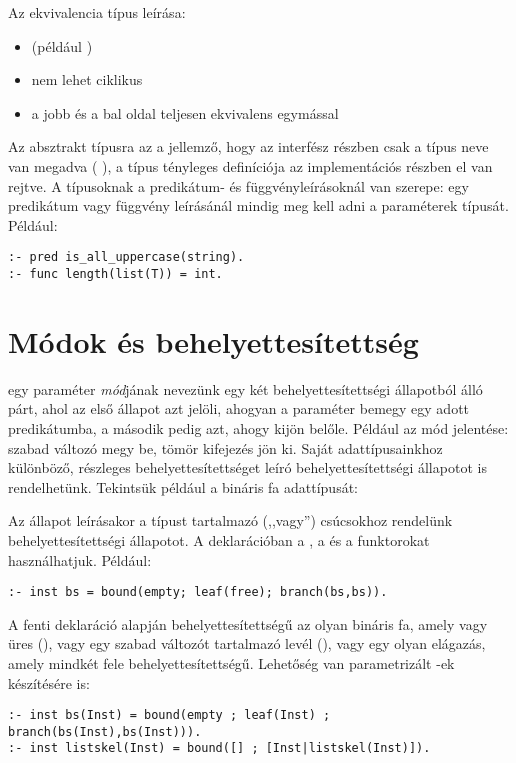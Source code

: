 Az ekvivalencia típus leírása:

\begin{itemize}
\item {}  \cd{==}  (például
)
\item nem lehet ciklikus
\item a jobb és a bal oldal teljesen ekvivalens egymással
\end{itemize}

Az absztrakt típusra az a jellemző, hogy az interfész részben csak a típus neve
van megadva ( ), a típus tényleges definíciója az
implementációs részben el van rejtve.
\br
A típusoknak a predikátum- és függvényleírásoknál van szerepe: egy predikátum
vagy függvény leírásánál mindig meg kell adni a paraméterek típusát. Például:

\begin{verbatim}
:- pred is_all_uppercase(string).
:- func length(list(T)) = int.
\end{verbatim}

\section{Módok és behelyettesítettség}

 egy paraméter \emph{mód}jának nevezünk egy két behelyettesítettségi állapotból
álló párt, ahol az első állapot azt jelöli, ahogyan a paraméter bemegy egy adott
predikátumba, a második pedig azt, ahogy kijön belőle. Például az  mód jelentése:
szabad változó megy be, tömör kifejezés jön ki.
\br
Saját adattípusainkhoz különböző, részleges behelyettesítettséget leíró behelyettesítettségi
állapotot is rendelhetünk. Tekintsük például a bináris fa adattípusát:


Az állapot leírásakor a típust tartalmazó (,,vagy'') csúcsokhoz rendelünk
behelyettesítettségi állapotot. A deklarációban a , a  és a
 funktorokat használhatjuk. Például:
\begin{verbatim}
:- inst bs = bound(empty; leaf(free); branch(bs,bs)).
\end{verbatim}
A fenti deklaráció alapján  behelyettesítettségű az olyan bináris fa, amely
vagy üres (), vagy egy szabad változót tartalmazó levél (),
vagy egy olyan elágazás, amely mindkét fele  behelyettesítettségű. Lehetőség
van parametrizált -ek készítésére is:
\begin{verbatim}
:- inst bs(Inst) = bound(empty ; leaf(Inst) ; branch(bs(Inst),bs(Inst))).
:- inst listskel(Inst) = bound([] ; [Inst|listskel(Inst)]).
\end{verbatim}

